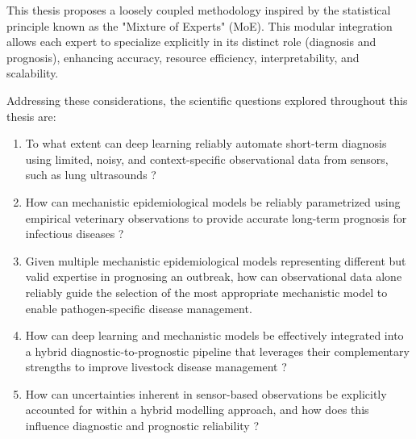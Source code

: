 This thesis proposes a loosely coupled methodology inspired by the statistical principle known as the "Mixture of Experts" (MoE). This modular integration allows each expert to specialize explicitly in its distinct role (diagnosis and prognosis), enhancing accuracy, resource efficiency, interpretability, and scalability.

Addressing these considerations, the scientific questions explored throughout this thesis are:

\begin{enumerate}
    \item To what extent can deep learning reliably automate short-term diagnosis using limited, noisy, and context-specific observational data from sensors, such as lung ultrasounds ? 
    
    \item How can mechanistic epidemiological models be reliably parametrized using empirical veterinary observations to provide accurate long-term prognosis for infectious diseases ?
    
    
    
    \item Given multiple mechanistic epidemiological models representing different but valid expertise in prognosing an outbreak, how can observational data alone reliably guide the selection of the most appropriate mechanistic model to enable pathogen-specific disease management.

    \item How can deep learning and mechanistic models be effectively integrated into a hybrid diagnostic-to-prognostic pipeline that leverages their complementary strengths to improve livestock disease management ?
    
    \item How can uncertainties inherent in sensor-based observations be explicitly accounted for within a hybrid modelling approach, and how does this influence diagnostic and prognostic reliability ?
\end{enumerate}


